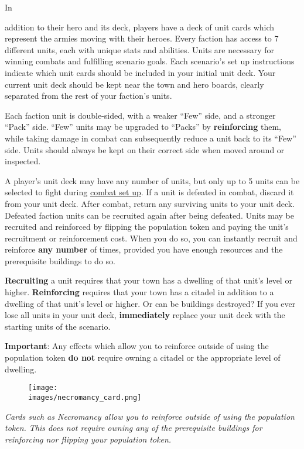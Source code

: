 \hypertarget{Units}{In} addition to their hero and its deck, players have a deck of unit cards which represent the armies moving with their heroes.
Every faction has access to 7 different units, each with unique stats and abilities.
Units are necessary for winning combats and fulfilling scenario goals.
Each scenario's set up instructions indicate which unit cards should be included in your initial unit deck.
Your current unit deck should be kept near the town and hero boards, clearly separated from the rest of your faction’s units.\par
Each faction unit is double-sided, with a weaker “Few” side, and a stronger “Pack” side.
“Few” units may be upgraded to “Packs” by \textbf{reinforcing} them, while taking damage in combat can subsequently reduce a unit back to its “Few” side.
Units should always be kept on their correct side when moved around or inspected.\par
A player’s unit deck may have any number of units, but only up to 5 units can be selected to fight during \hyperlink{Combatsetup}{combat set up}.
If a unit is defeated in combat, discard it from your unit deck.
After combat, return any surviving units to your unit deck.
Defeated faction units can be recruited again after being defeated.
Units may be recruited and reinforced by flipping the population token and paying the unit's recruitment  or reinforcement  cost.
When you do so, you can instantly recruit and reinforce \textbf{any number} of times, provided you have enough resources and the prerequisite buildings to do so.\par
\textbf{Recruiting} a unit requires that your town has a dwelling of that unit’s level or higher.
\textbf{Reinforcing} requires that your town has a citadel in addition to a dwelling of that unit’s level or higher.
Or can be buildings destroyed?
If you ever lose all units in your unit deck, \textbf{immediately} replace your unit deck with the starting units of the scenario.\par

\textbf{Important}: Any effects which allow you to reinforce outside of using the population token \textbf{do not} require owning a citadel or the appropriate level of dwelling.
\begin{figure}[h]
\centering
\texttt{[image: \\images/necromancy\_card.png]}
\end{figure}
\begin{center}
\small\textit{Cards such as Necromancy allow you to reinforce outside of using the population token.
This does not require owning any of the prerequisite buildings for reinforcing nor flipping your population token.}
\end{center}

